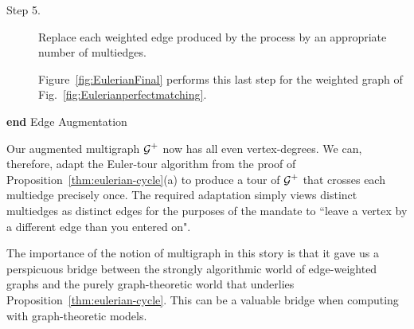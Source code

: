 \begin{description}
\medskip\item[Step 5.]
%
Replace each weighted edge produced by the process by an appropriate number of multiedges.

\smallskip

Figure~\ref{fig:EulerianFinal} performs this last step for the weighted graph of Fig.~\ref{fig:Eulerianperfectmatching}.
\end{description}
{\bf end} {\sf Edge Augmentation}

\bigskip

Our augmented multigraph $\mbox{$\cal G$}^+$ now has all even vertex-degrees.  We can, therefore, adapt the Euler-tour algorithm from the proof of Proposition~\ref{thm:eulerian-cycle}(a) to produce a tour of $\mbox{$\cal G$}^+$ that crosses each multiedge precisely once.  The required adaptation simply views distinct multiedges as distinct edges for the purposes of the mandate to ``leave a vertex by a different edge than you entered on".

\medskip

The importance of the notion of multigraph in this story is that it gave us a perspicuous bridge between the strongly algorithmic world of edge-weighted graphs and the purely graph-theoretic world that underlies Proposition~\ref{thm:eulerian-cycle}.  This can be a valuable bridge when computing with graph-theoretic models.
